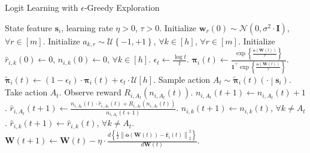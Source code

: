 \documentclass[10pt]{article}
\def\rvo{{\mathbf{o}}}
\def\rvr{{\mathbf{r}}}
\def\rvs{{\mathbf{s}}}
\def\rvw{{\mathbf{w}}}
\def\rvo{{\mathbf{o}}}
\def\rvone{{\mathbf{1}}}
\def\rvpi{{\boldsymbol{\pi}}}
\def\rmI{{\mathbf{I}}}
\def\rmW{{\mathbf{W}}}
\def\gN{{\mathcal{N}}}
\def\gU{{\mathcal{U}}}
\begin{document}
\begin{algorithm}[h]
   \caption{Logit Learning with $\epsilon$-Greedy Exploration}
\label{alg:policy_gradient_uniform_exploration}
\begin{algorithmic}
    State feature $\rvs_i$, learning rate $\eta > 0$, $\tau > 0$.
   \STATE Initialize $\rvw_r(0) \sim \gN\left( 0, \sigma^2 \cdot \rmI \right)$, $\forall r \in [m]$. \STATE Initialize $a_{k, r} \sim \gU\left\{-1, +1\right\}$, $\forall k \in [h]$, $\forall r \in [m]$.
   \STATE Initialize $\hat{r}_{i,k}\left(0\right) \gets 0$, $n_{i,k}\left(0\right) \gets 0$, $\forall k \in [h]$.
   \STATE $\epsilon_t \gets \frac{\log{t}}{t}$.
   \STATE $\rvpi_i\left(t\right) \gets \frac{ \exp\left\{ \frac{ \rvo\left( \rmW\left(t\right)\right) }{\tau} \right\} }{\rvone^\top \exp\left\{ \frac{ \rvo\left( \rmW\left(t\right)\right) }{\tau} \right\} } $.
   \STATE $\tilde{\rvpi}_i\left(t\right) \gets \left( 1 - \epsilon_t \right) \cdot  \rvpi_i\left(t\right) + \epsilon_t \cdot \gU{\left[ h \right]}$.
   \STATE Sample action $A_{t} \sim \tilde{\rvpi}_{i}\left(t\right)\left(\cdot \middle| \rvs_i \right)$.
   \STATE Take action $A_{t}$. Observe reward $R_{i, A_{t}}\left(n_{i, A_{t}}\left(t\right) \right)$.
   \STATE $n_{i, A_{t}}\left(t+1\right) \gets n_{i, A_{t}}\left(t\right) + 1$.
   \STATE $\hat{r}_{i,A_{t}}\left(t+1\right) \gets \frac{n_{i, A_{t}}\left(t\right) \cdot \hat{r}_{i,A_{t}}\left(t\right) + R_{i, A_{t}}\left(n_{i, A_{t}}\left(t\right)\right) }{n_{i, A_{t}}\left(t+1\right)}$.
   \STATE $n_{i, k}\left(t+1\right) \gets n_{i, k}\left(t\right)$, $\forall k \not= A_t$.
   \STATE $\hat{r}_{i,k}\left(t+1\right) \gets \hat{r}_{i,k}\left(t\right)$, $\forall k \not= A_t$.
   \STATE $\rmW(t+1) \leftarrow \rmW(t) - \eta \cdot \frac{d \left\{ \frac{1}{2} \left\| \rvo\left( \rmW\left(t\right)\right) - \hat{\rvr}_i\left(t\right) \right\|_2^2 \right\}}{d \rmW(t)}$.
   \ENDFOR
\end{algorithmic}
\end{algorithm}
\end{document}

